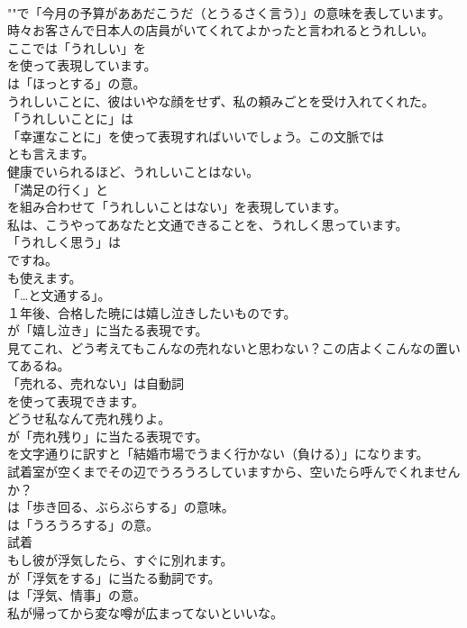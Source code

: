 \documentclass[8pt]{extreport}
\begin{document}
\begin{CJK}{UTF8}{min}
\\	""で「今月の予算がああだこうだ（とうるさく言う）」の意味を表しています。
\\	時々お客さんで日本人の店員がいてくれてよかったと言われるとうれしい。 
\\	ここでは「うれしい」を 
\\	を使って表現しています。
\\	は「ほっとする」の意。	
\\	うれしいことに、彼はいやな顔をせず、私の頼みごとを受け入れてくれた。 
\\	「うれしいことに」は
\\	「幸運なことに」を使って表現すればいいでしょう。この文脈では
\\	とも言えます。	
\\	健康でいられるほど、うれしいことはない。 
\\	「満足の行く」と
\\	を組み合わせて「うれしいことはない」を表現しています。	
\\	私は、こうやってあなたと文通できることを、うれしく思っています。 
\\	「うれしく思う」は
\\	ですね。
\\	も使えます。
\\	「…と文通する」。	
\\	１年後、合格した暁には嬉し泣きしたいものです。 
\\	が「嬉し泣き」に当たる表現です。	
\\	見てこれ、どう考えてもこんなの売れないと思わない？この店よくこんなの置いてあるね。 
\\	「売れる、売れない」は自動詞 
\\	を使って表現できます。	
\\	どうせ私なんて売れ残りよ。 
\\	が「売れ残り」に当たる表現です。
\\	を文字通りに訳すと「結婚市場でうまく行かない（負ける）」になります。	
\\	試着室が空くまでその辺でうろうろしていますから、空いたら呼んでくれませんか？ 
\\	は「歩き回る、ぶらぶらする」の意味。
\\	は「うろうろする」の意。	
\\	試着
\\	もし彼が浮気したら、すぐに別れます。 
\\	が「浮気をする」に当たる動詞です。
\\	は「浮気、情事」の意。	
\\	私が帰ってから変な噂が広まってないといいな。 

\end{CJK}
\end{document}
